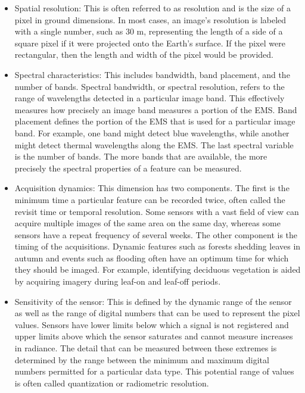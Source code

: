     \begin{itemize}
        \item Spatial resolution: This is often referred to as resolution and is the size of a pixel in ground dimensions. 
        In most cases, an image's resolution is labeled with a single number, such as 30 m, representing the length of a side of a square pixel if it were projected onto the Earth's surface.
        If the pixel were rectangular, then the length and width of the pixel would be provided.
        \item Spectral characteristics: This includes bandwidth, band placement, and the number of bands.
        Spectral bandwidth, or spectral resolution, refers to the range of wavelengths detected in a particular image band.
        This effectively measures how precisely an image band measures a portion of the EMS.
        Band placement defines the portion of the EMS that is used for a particular image band.
        For example, one band might detect blue wavelengths, while another might detect thermal wavelengths along the EMS.
        The last spectral variable is the number of bands. The more bands that are available, the more precisely the spectral properties of a feature can be measured.
        \item Acquisition dynamics: This dimension has two components. The first is the minimum time a particular feature can be recorded twice, often called the revisit time or temporal resolution.
        Some sensors with a vast field of view can acquire multiple images of the same area on the same day, whereas some sensors have a repeat frequency of several weeks.
        The other component is the timing of the acquisitions. 
        Dynamic features such as forests shedding leaves in autumn and events such as flooding often have an optimum time for which they should be imaged.
        For example, identifying deciduous vegetation is aided by acquiring imagery during leaf-on and leaf-off periods.
        \item Sensitivity of the sensor: This is defined by the dynamic range of the sensor as well as the range of digital numbers that can be used to represent the pixel values.
        Sensors have lower limits below which a signal is not registered and upper limits above which the sensor saturates and cannot measure increases in radiance.
        The detail that can be measured between these extremes is determined by the range between the minimum and maximum digital numbers permitted for a particular data type.
        This potential range of values is often called quantization or radiometric resolution.
    \end{itemize}
    
